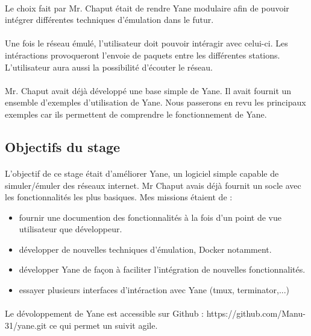 \documentclass{article}
\begin{document}
	\paragraph{}
	Le choix fait par Mr. Chaput était de rendre Yane modulaire afin de pouvoir intégrer différentes techniques d'émulation dans le futur.

	\paragraph{}
	Une fois le réseau émulé, l'utilisateur doit pouvoir intéragir avec celui-ci. Les intéractions provoqueront l'envoie de paquets entre les différentes stations. L'utilisateur aura aussi la possibilité d'écouter le réseau.
	
	\paragraph{}
	Mr. Chaput avait déjà développé une base simple de Yane. Il avait fournit un ensemble d'exemples d'utilisation de Yane. Nous passerons en revu les principaux exemples car ils permettent de comprendre le fonctionnement de Yane.
	
	
	\subsection{Objectifs du stage}

	\paragraph{}
	L'objectif de ce stage était d'améliorer Yane, un logiciel simple capable de simuler/émuler des réseaux internet. Mr Chaput avais déjà fournit un socle avec les fonctionnalités les plus basiques. Mes missions étaient de :
			\begin{itemize}
				\item fournir une documention des fonctionnalités à la fois d'un point de vue utilisateur que développeur.
				\item développer de nouvelles techniques d'émulation, Docker notamment.
				\item développer Yane de façon à faciliter l'intégration de nouvelles fonctionnalités.
				\item essayer plusieurs interfaces d'intéraction avec Yane (tmux, terminator,...)
			\end{itemize}

	\paragraph{}
	Le dévoloppement de Yane est accessible sur Github :
	\newline https://github.com/Manu-31/yane.git ce qui permet un suivit agile.
\end{document}
